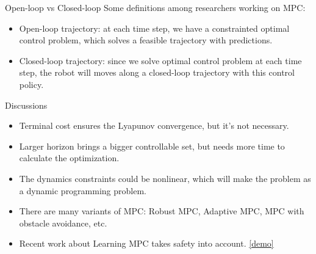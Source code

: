 \documentclass{beamer}
\begin{document}
\begin{frame}{Open-loop vs Closed-loop }
	Some definitions among researchers working on MPC:
	\begin{itemize}
		\item Open-loop trajectory: at each time step, we have a constrainted optimal control problem, which solves a feasible trajectory with predictions.
		\item Closed-loop trajectory: since we solve optimal control problem at each time step, the robot will moves along a closed-loop trajectory with this control policy.
	\end{itemize}
\end{frame}

\begin{frame}{Discussions}
	\begin{itemize}
		\item Terminal cost ensures the Lyapunov convergence, but it's not necessary.
		\item Larger horizon brings a bigger controllable set, but needs more time to calculate the optimization.
		\item The dynamics constraints could be nonlinear, which will make the problem as a dynamic programming problem.
		\item There are many variants of MPC: Robust MPC, Adaptive MPC, MPC with obstacle avoidance, etc.
		\item Recent work about Learning MPC takes safety into account. \href{https://www.youtube.com/watch?v=W4LkQaTvzhI&feature=emb_title}{[demo]}
	\end{itemize}
\end{frame}





\end{document}
